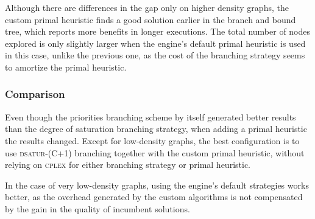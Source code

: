 Although there are differences in the gap only on higher density graphs, the custom primal heuristic finds a good solution earlier in the branch and bound tree, which reports more benefits in longer executions. The total number of nodes explored is only slightly larger when the engine's default primal heuristic is used in this case, unlike the previous one, as the cost of the branching strategy seems to amortize the primal heuristic. 

\subsubsection*{Comparison}

Even though the priorities branching scheme by itself generated better results than the degree of saturation branching strategy, when adding a primal heuristic the results changed. Except for low-density graphs, the best configuration is to use \textsc{dsatur-(C+1)} branching together with the custom primal heuristic, without relying on \textsc{cplex} for either branching strategy or primal heuristic. 

In the case of very low-density graphs, using the engine's default strategies works better, as the overhead generated by the custom algorithms is not compensated by the gain in the quality of incumbent solutions. 